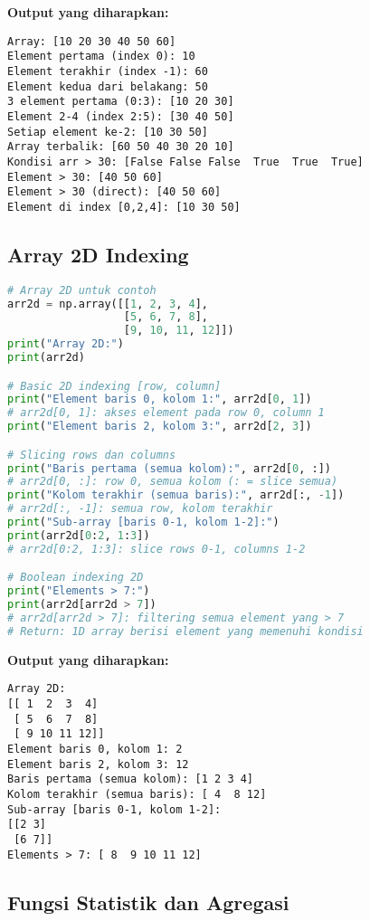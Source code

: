 \textbf{Output yang diharapkan:}
\begin{lstlisting}[style=bash]
Array: [10 20 30 40 50 60]
Element pertama (index 0): 10
Element terakhir (index -1): 60
Element kedua dari belakang: 50
3 element pertama (0:3): [10 20 30]
Element 2-4 (index 2:5): [30 40 50]
Setiap element ke-2: [10 30 50]
Array terbalik: [60 50 40 30 20 10]
Kondisi arr > 30: [False False False  True  True  True]
Element > 30: [40 50 60]
Element > 30 (direct): [40 50 60]
Element di index [0,2,4]: [10 30 50]
\end{lstlisting}

\subsection*{Array 2D Indexing}

\begin{lstlisting}[language=python, caption={Indexing Array Multidimensional}, style=python]
# Array 2D untuk contoh
arr2d = np.array([[1, 2, 3, 4],
                  [5, 6, 7, 8],
                  [9, 10, 11, 12]])
print("Array 2D:")
print(arr2d)

# Basic 2D indexing [row, column]
print("Element baris 0, kolom 1:", arr2d[0, 1])
# arr2d[0, 1]: akses element pada row 0, column 1
print("Element baris 2, kolom 3:", arr2d[2, 3])

# Slicing rows dan columns
print("Baris pertama (semua kolom):", arr2d[0, :])
# arr2d[0, :]: row 0, semua kolom (: = slice semua)
print("Kolom terakhir (semua baris):", arr2d[:, -1])
# arr2d[:, -1]: semua row, kolom terakhir
print("Sub-array [baris 0-1, kolom 1-2]:")
print(arr2d[0:2, 1:3])
# arr2d[0:2, 1:3]: slice rows 0-1, columns 1-2

# Boolean indexing 2D
print("Elements > 7:")
print(arr2d[arr2d > 7])
# arr2d[arr2d > 7]: filtering semua element yang > 7
# Return: 1D array berisi element yang memenuhi kondisi
\end{lstlisting}

\textbf{Output yang diharapkan:}
\begin{lstlisting}[style=bash]
Array 2D:
[[ 1  2  3  4]
 [ 5  6  7  8]
 [ 9 10 11 12]]
Element baris 0, kolom 1: 2
Element baris 2, kolom 3: 12
Baris pertama (semua kolom): [1 2 3 4]
Kolom terakhir (semua baris): [ 4  8 12]
Sub-array [baris 0-1, kolom 1-2]:
[[2 3]
 [6 7]]
Elements > 7: [ 8  9 10 11 12]
\end{lstlisting}

\subsection*{Fungsi Statistik dan Agregasi}

